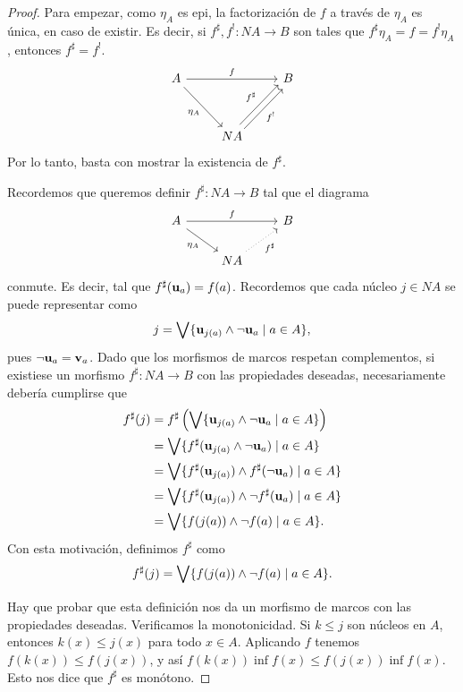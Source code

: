 \begin{proof}
  Para empezar, como $\eta_A$ es epi, la factorización de $f$ a
  través de $\eta_A$ es única, en caso de existir.
  Es decir, si $f^\sharp,f^!:NA\to B$ son tales que
  $f^\sharp\eta_A=f=f^!\eta_A$, entonces $f^\sharp=f^!$.
  \[
    \begin{tikzcd}
      A \ar[dr,"\eta_A"'] \ar[rr,"f"] && B \\[5mm]
      & NA \ar[ur,shift right,"f^!"'] \ar[ur,shift left,"f^\sharp"]
    \end{tikzcd}
  \]
  Por lo tanto, basta con mostrar la existencia de $f^\sharp$.
  
  Recordemos que queremos definir $f^\sharp:NA\to B$ tal que el
  diagrama 
  \[
    \begin{tikzcd}
      A \ar[dr,"\eta_A"'] \ar[rr,"f"] && B \\
      & NA \ar[ur,"f^\sharp"',dotted]
    \end{tikzcd}
  \]
  conmute.
  Es decir, tal que $f^\sharp(\mathbf u_{a}) = f(a)$.
  Recordemos que cada núcleo $j\in NA$ se puede representar como
  \[
    j = \bigvee\{\mathbf u_{j(a)} \wedge \neg \mathbf u_{a} \mid a\in A\}
  ,\]
  pues $\neg\mathbf u_{a} = \mathbf v_{a}$.
  Dado que los morfismos de marcos respetan complementos,
  si existiese un morfismo $f^\sharp:NA\to B$ con las propiedades
  deseadas, necesariamente debería cumplirse que
  \begin{align*}
    f^\sharp(j)
    &= f^\sharp\left(
      \bigvee\{\mathbf u_{j(a)}\wedge\neg\mathbf u_{a}\mid a\in A\}
      \right) \\
    &= \bigvee\{f^\sharp(\mathbf u_{j(a)}\wedge\neg\mathbf u_{a})\mid a\in A\} \\
    &= \bigvee\{f^\sharp(\mathbf u_{j(a)})\wedge f^\sharp(\neg\mathbf u_{a})
       \mid a\in A\} \\
    &= \bigvee\{f^\sharp(\mathbf u_{j(a)})\wedge \neg f^\sharp(\mathbf u_{a})
       \mid a\in A\} \\
    &= \bigvee\{f(j(a))\wedge \neg f(a) \mid a\in A\}.
  \end{align*}
  Con esta motivación, definimos $f^\sharp$ como
  \[
    f^\sharp(j) = \bigvee\{f(j(a))\wedge\neg f(a) \mid a\in A\}
  .\]
  
  Hay que probar que esta definición nos da un morfismo de marcos
  con las propiedades deseadas.
  Verificamos la monotonicidad.
  Si $k\leq j$ son núcleos en $A$, entonces $k(x)\leq j(x)$ para
  todo $x\in A$.
  Aplicando $f$ tenemos $f(k(x))\leq f(j(x))$, y así $f(k(x))\inf
  f(x)\leq f(j(x))\inf f(x)$.
  Esto nos dice que $f^\sharp$ es monótono.


\end{proof}
